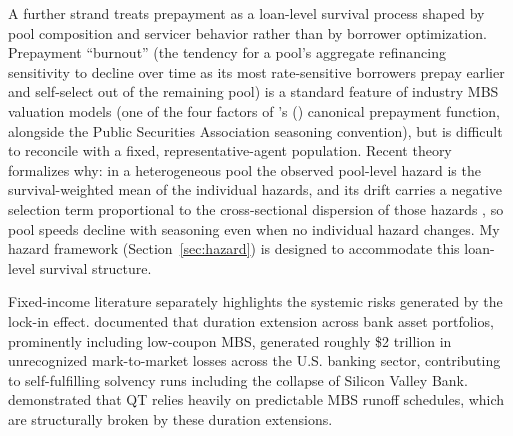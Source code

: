 \documentclass[12pt]{article}
\newcommand{\citepos}[1]{\citeauthor{#1}'s (\citeyear{#1})}
\begin{document}
A further strand treats prepayment as a loan-level survival process shaped by pool composition and servicer behavior rather than by borrower optimization. Prepayment ``burnout'' (the tendency for a pool's aggregate refinancing sensitivity to decline over time as its most rate-sensitive borrowers prepay earlier and self-select out of the remaining pool) is a standard feature of industry MBS valuation models (one of the four factors of \citepos{richard1989} canonical prepayment function, alongside the Public Securities Association seasoning convention), but is difficult to reconcile with a fixed, representative-agent population. Recent theory formalizes why: in a heterogeneous pool the observed pool-level hazard is the survival-weighted mean of the individual hazards, and its drift carries a negative selection term proportional to the cross-sectional dispersion of those hazards \citep{lesniewski2026}, so pool speeds decline with seasoning even when no individual hazard changes. My hazard framework (Section~\ref{sec:hazard}) is designed to accommodate this loan-level survival structure.

Fixed-income literature separately highlights the systemic risks generated by the lock-in effect. \citet{jiang2023} documented that duration extension across bank asset portfolios, prominently including low-coupon MBS, generated roughly \$2 trillion in unrecognized mark-to-market losses across the U.S. banking sector, contributing to self-fulfilling solvency runs including the collapse of Silicon Valley Bank. \citet{smith2023} demonstrated that QT relies heavily on predictable MBS runoff schedules, which are structurally broken by these duration extensions.
\end{document}
